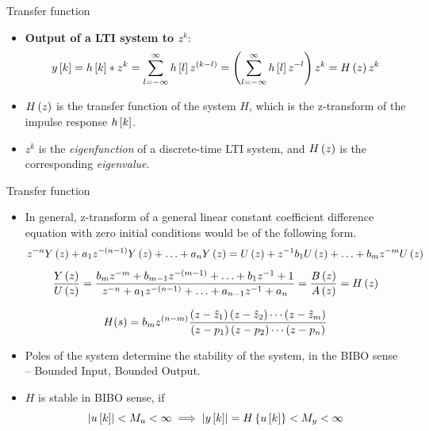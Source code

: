 \documentclass[aspectratio=169]{beamer}
\def\lp{\ensuremath\left(}
\def\rp{\ensuremath\right)}
\def\lv{\ensuremath\left\lvert}
\def\rv{\ensuremath\right\rvert}
\def\lc{\ensuremath\left\{}
\def\rc{\ensuremath\right\}}
\def\ls{\ensuremath\left[}
\def\rs{\ensuremath\right]}
\begin{document}
\begin{frame}{Transfer function}
\begin{center}
\end{center}

\begin{itemize}
    \item \textbf{Output of a LTI system to $z^k$}: 
    \[ y\ls k\rs = h\ls k\rs * z^k = \sum_{l=-\infty}^{\infty} h\ls l\rs z^{\lp k - l\rp} = \lp \sum_{l=-\infty}^{\infty} h\ls l\rs z^{-l} \rp z^k = H\lp z\rp z^k\]

    \item $H\lp z\rp$ is the transfer function of the system $H$, which is the z-transform of the impulse response $h\ls k\rs$.

    \item $z^k$ is the \textit{eigenfunction} of a discrete-time LTI system, and $H\lp z\rp$ is the corresponding \textit{eigenvalue}.
\end{itemize}
\end{frame}


\begin{frame}{Transfer function}
\begin{itemize}    
    \item In general, z-transform of a general linear constant coefficient difference equation with zero initial conditions would be of the following form.
    \[ z^{-n}Y\lp z\rp + a_1z^{-\lp n -1\rp}Y\lp z\rp + \ldots + a_nY\lp z\rp = U\lp z\rp + z^{-1}b_1U\lp z\rp + \ldots + b_mz^{-m}U\lp z\rp \]
    \[ \frac{Y\lp z\rp}{U\lp z\rp} = \frac{b_mz^{-m} + b_{m-1}z^{-\lp m-1\rp} + \ldots + b_{1}z^{-1} + 1}{z^{-n} + a_1z^{-\lp n-1\rp} + \ldots + a_{n-1}z^{-1} + a_n}  = \frac{B\lp z\rp}{A\lp z\rp} = H\lp z\rp\]

    \[ H(s) = b_mz^{\lp n - m\rp}\frac{\lp z - \hat{z}_1\rp\lp z - \hat{z}_2\rp\cdots\lp z - \hat{z}_m\rp}{\lp z - p_1\rp\lp z - p_2\rp\cdots\lp z - p_n\rp} \]

    \item Poles of the system determine the stability of the system, in the BIBO sense -- Bounded Input, Bounded Output.

    \item $H$ is stable in BIBO sense, if
    \[ \lv u\ls k\rs \rv < M_u < \infty \implies \lv y\ls k\rs\rv = H\lc u\ls k\rs\rc < M_y < \infty \]
\end{itemize}
\end{frame}
\end{document}

